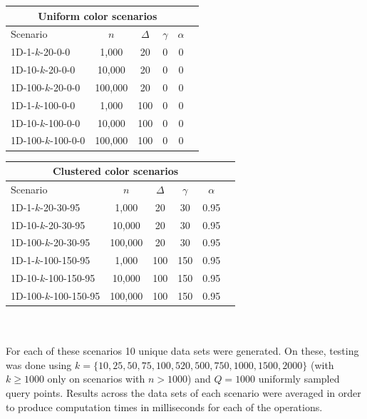 \documentclass{article}
\begin{document}
\hskip-2.3cm
\begin{tabular}{|l||c|c|c|c|c|}
    \hline
    \multicolumn{5}{|c|}{Uniform color scenarios}                 \\
    \hline
    Scenario           & $n$     & $\Delta$ & $\gamma$ & $\alpha$ \\
    \hline
    1D-1-$k$-20-0-0    & 1,000   & 20       & 0        & 0        \\
    1D-10-$k$-20-0-0   & 10,000  & 20       & 0        & 0        \\
    1D-100-$k$-20-0-0  & 100,000 & 20       & 0        & 0        \\
    1D-1-$k$-100-0-0   & 1,000   & 100      & 0        & 0        \\
    1D-10-$k$-100-0-0  & 10,000  & 100      & 0        & 0        \\
    1D-100-$k$-100-0-0 & 100,000 & 100      & 0        & 0        \\
    \hline
\end{tabular}
\:\:
\begin{tabular}{|l||c|c|c|c|c|}
    \hline
    \multicolumn{5}{|c|}{Clustered color scenarios}                  \\
    \hline
    Scenario              & $n$     & $\Delta$ & $\gamma$ & $\alpha$ \\
    \hline
    1D-1-$k$-20-30-95     & 1,000   & 20       & 30       & 0.95     \\
    1D-10-$k$-20-30-95    & 10,000  & 20       & 30       & 0.95     \\
    1D-100-$k$-20-30-95   & 100,000 & 20       & 30       & 0.95     \\
    1D-1-$k$-100-150-95   & 1,000   & 100      & 150      & 0.95     \\
    1D-10-$k$-100-150-95  & 10,000  & 100      & 150      & 0.95     \\
    1D-100-$k$-100-150-95 & 100,000 & 100      & 150      & 0.95     \\
    \hline
\end{tabular}\\\\
For each of these scenarios 10 unique data sets were generated. On these, testing was done using $k=\{10, 25, 50, 75, 100, 520, 500, 750, 1000, 1500, 2000\}$ (with $k\geq1000$ only on scenarios with $n > 1000$) and $Q=1000$ uniformly sampled query points. Results across the data sets of each scenario were averaged in order to produce computation times in milliseconds for each of the operations. \\\\
\end{document}
